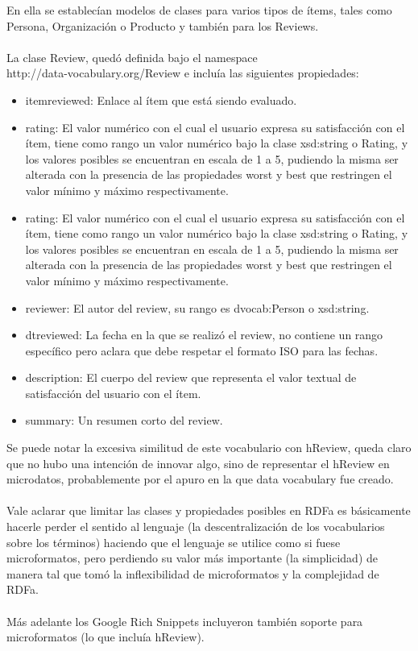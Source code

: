 En ella se establecían modelos de clases para varios tipos de ítems, tales como Persona, Organización o Producto y también para los Reviews.
\\\\
La clase Review, quedó definida bajo el namespace \\\noindent http://data-vocabulary.org/Review e incluía las siguientes propiedades:
\begin{itemize}
 \item itemreviewed: Enlace al ítem que está siendo evaluado.
 \item rating: El valor numérico con el cual el usuario expresa su satisfacción con el ítem, tiene como rango un valor numérico bajo la clase 
 xsd:string o Rating, y los valores posibles se encuentran en escala de 1 a 5, pudiendo la misma ser alterada con la presencia de las 
 propiedades worst y best que restringen el valor mínimo y máximo respectivamente.
 \item rating: El valor numérico con el cual el usuario expresa su satisfacción con el ítem, tiene como rango un valor numérico bajo la clase 
 xsd:string o Rating, y los valores posibles se encuentran en escala de 1 a 5, pudiendo la misma ser alterada con la presencia de las 
 propiedades worst y best que restringen el valor mínimo y máximo respectivamente.
 \item reviewer: El autor del review, su rango es dvocab:Person o xsd:string.
 \item dtreviewed: La fecha en la que se realizó el review, no contiene un rango específico pero aclara que debe respetar el formato 
 ISO para las fechas.
 \item description: El cuerpo del review que representa el valor textual de satisfacción del usuario con el ítem.
 \item summary: Un resumen corto del review.
\end{itemize}

Se puede notar la excesiva similitud de este vocabulario con hReview, queda claro que no hubo una intención de innovar algo, 
sino de representar el hReview en microdatos, probablemente por el apuro en la que data vocabulary fue creado.
\\\\
Vale aclarar que limitar las clases y propiedades posibles en RDFa es básicamente hacerle perder el sentido al lenguaje 
(la descentralización de los vocabularios sobre los términos) haciendo que el lenguaje se utilice como si fuese microformatos, 
pero perdiendo su valor más importante (la simplicidad) de manera tal que tomó la inflexibilidad de microformatos y la complejidad 
de RDFa.
\\\\
Más adelante los Google Rich Snippets incluyeron también soporte para microformatos (lo que incluía hReview). 


